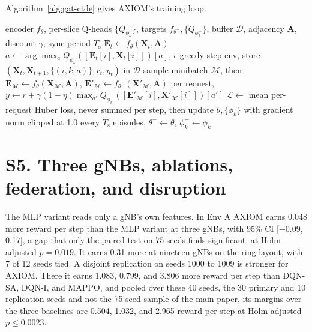 \documentclass[9pt]{extarticle}
\begin{document}
Algorithm~\ref{alg:gat-ctde} gives AXIOM's training loop.

\begin{algorithm}[!htbp]
\caption{Centralised training and decentralised execution of AXIOM}
\label{alg:gat-ctde}
\begin{algorithmic}[1]
\REQUIRE encoder $f_\theta$, per-slice Q-heads $\{Q_{\phi_k}\}$, targets $f_{\theta^-},\{Q_{\phi_k^-}\}$, buffer $\mathcal{D}$, adjacency $\mathbf{A}$, discount $\gamma$, sync period $T_{\mathrm{s}}$
  \STATE $\mathbf{E}_t \gets f_\theta(\mathbf{X}_t, \mathbf{A})$ 
    \STATE $a \gets \arg\max_a Q_{\phi_k}([\mathbf{E}_t[i], \mathbf{X}_t[i]])[a]$, $\epsilon$-greedy 
  \ENDFOR
  \STATE step env, store $(\mathbf{X}_t, \mathbf{X}_{t+1}, \{(i,k,a)\}, r_t, \eta_t)$ in $\mathcal{D}$
    \STATE sample minibatch $\mathcal{M}$, then $\mathbf{E}_{\mathcal{M}} \gets f_\theta(\mathbf{X}_{\mathcal{M}},\mathbf{A})$, $\mathbf{E}'_{\mathcal{M}} \gets f_{\theta^-}(\mathbf{X}'_{\mathcal{M}},\mathbf{A})$
    \STATE per request, $y \gets r + \gamma(1{-}\eta)\max_{a'} Q_{\phi_k^-}([\mathbf{E}'_{\mathcal{M}}[i], \mathbf{X}'_{\mathcal{M}}[i]])[a']$
    \STATE $\mathcal{L} \gets$ mean per-request Huber loss, never summed per step, then update $\theta,\{\phi_k\}$ with gradient norm clipped at 1.0
  \ENDIF
  \STATE every $T_{\mathrm{s}}$ episodes, $\theta^-\gets\theta$, $\phi_k^-\gets\phi_k$
\ENDFOR
\end{algorithmic}
\end{algorithm}

\section*{S5. Three gNBs, ablations, federation, and disruption}
The MLP variant reads only a gNB's own features. In Env A AXIOM earns 0.048 more reward per step than the MLP variant at three gNBs, with 95\% CI [$-$0.09, 0.17], a gap that only the paired test on 75 seeds finds significant, at Holm-adjusted $p=0.019$. It earns 0.31 more at nineteen gNBs on the ring layout, with 7 of 12 seeds tied. A disjoint replication on seeds 1000 to 1009 is stronger for AXIOM. There it earns 1.083, 0.799, and 3.806 more reward per step than DQN-SA, DQN-I, and MAPPO, and pooled over these 40 seeds, the 30 primary and 10 replication seeds and not the 75-seed sample of the main paper, its margins over the three baselines are 0.504, 1.032, and 2.965 reward per step at Holm-adjusted $p\leq0.0023$.
\end{document}
